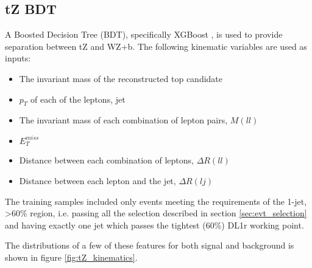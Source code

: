 \subsection{tZ BDT}
\label{subsec:tZ_bdt}
 
A Boosted Decision Tree (BDT), specifically XGBoost \cite{xgboost_cite}, is used to provide separation between tZ and WZ+b. The following kinematic variables are used as inputs:
 
 \begin{itemize}
     \item The invariant mass of the reconstructed top candidate
     \item $p_T$ of each of the leptons, jet
     \item The  invariant mass of each combination of lepton pairs, $M(ll)$
     \item $E_T^{miss}$
     \item Distance between each combination of leptons, $\Delta R (ll)$
     \item Distance between each lepton and the jet, $\Delta R (lj)$
 \end{itemize}
 
The training samples included only events meeting the requirements of the 1-jet, >60\% region, i.e. passing all the selection described in section \ref{sec:evt_selection} and having exactly one jet which passes the tightest (60\%) DL1r working point.
 
The distributions of a few of these features for both signal and background is shown in figure \ref{fig:tZ_kinematics}.
 
